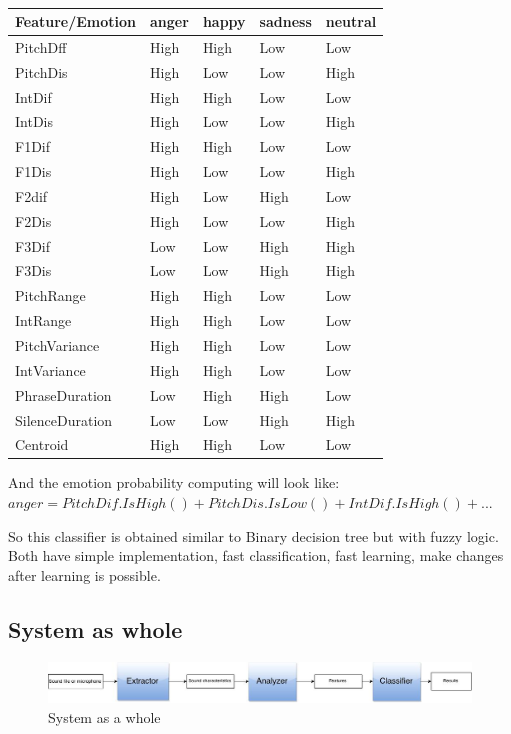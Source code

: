 \documentclass[14pt]{extarticle}
\begin{document}
\begin{table}[h]
	\centering
		\begin{tabular}{l|l|l|l|l|}
			\hline
				Feature/Emotion& anger&	happy	&sadness	&neutral\\ \hline
PitchDff&	High	&High	&Low	&Low\\ \hline 
PitchDis&	High	&Low&	Low&	High\\ \hline
IntDif&	High&	High&	Low&	Low\\ \hline
IntDis	&High	&Low&	Low&	High\\ \hline
F1Dif&	High&	High&	Low&	Low\\ \hline
F1Dis&	High	&Low&	Low&	High\\ \hline
F2dif	&High&	Low&	High&	Low\\ \hline
F2Dis&	High&	Low&	Low	&High\\ \hline
F3Dif&	Low&	Low&	High&	High\\ \hline
F3Dis&	Low	&Low&	High&	High\\ \hline
PitchRange&	High&	High&Low&	Low\\ \hline
IntRange&	High&	High&	Low&	Low\\ \hline
PitchVariance&	High&	High&Low&	Low\\ \hline
IntVariance	&High&	High&	Low	&Low\\ \hline
PhraseDuration&	Low&	High&	High	&Low\\ \hline
SilenceDuration	&Low	&Low	&High&	High\\ \hline
Centroid&	High	&High&	Low&	Low\\ \hline
 \hline
		\end{tabular}
	\caption{}
	\label{tab:}
\end{table}

And the emotion probability computing will look like:\\ $anger=PitchDif.IsHigh() + PitchDis.IsLow() + IntDif.IsHigh() + ...$

So this classifier is obtained similar to Binary decision tree but with fuzzy logic. Both have simple implementation, fast classification, fast learning, make changes after learning is possible.
\subsection{System as whole}

\begin{figure}[h]
	\centering
		\includegraphics[scale=0.3]{images/components.png}
	\caption{System as a whole}
	\label{fig:system}
\end{figure}
\end{document}
